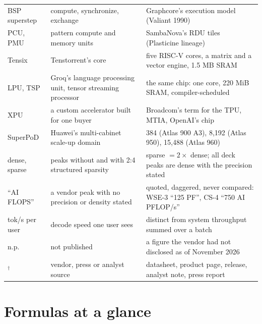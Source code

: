 \documentclass[11pt,letterpaper]{article}
\begin{document}
\begin{center}
\begin{tabular}{@{}lp{4.5cm}p{6.9cm}@{}}
BSP superstep & compute, synchronize, exchange & Graphcore's execution model (Valiant 1990)\\
PCU, PMU & pattern compute and memory units & SambaNova's RDU tiles (Plasticine lineage)\\
Tensix & Tenstorrent's core & five RISC-V cores, a matrix and a vector engine, 1.5 MB SRAM\\
LPU, TSP & Groq's language processing unit, tensor streaming processor & the same chip: one core, 220 MiB SRAM, compiler-scheduled\\
XPU & a custom accelerator built for one buyer & Broadcom's term for the TPU, MTIA, OpenAI's chip\\
SuperPoD & Huawei's multi-cabinet scale-up domain & 384 (Atlas 900 A3), 8{,}192 (Atlas 950), 15{,}488 (Atlas 960)\\
dense, sparse & peaks without and with 2:4 structured sparsity & sparse $= 2\times$ dense; all deck peaks are dense with the precision stated\\
``AI FLOPS'' & a vendor peak with no precision or density stated & quoted, daggered, never compared: WSE-3 ``125 PF'', CS-4 ``750 AI PFLOP/s''\\
tok/s per user & decode speed one user sees & distinct from system throughput summed over a batch\\
n.p. & not published & a figure the vendor had not disclosed as of November 2026\\
$^\dagger$ & vendor, press or analyst source & datasheet, product page, release, analyst note, press report\\
\bottomrule
\end{tabular}
\end{center}

\clearpage
\section{Formulas at a glance}
\end{document}
